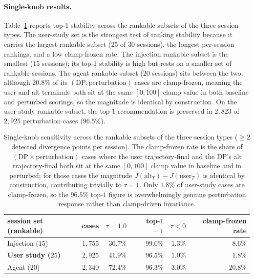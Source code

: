 \paragraph{Single-knob results.}
Table~\ref{tab:results-sensitivity-headline} reports top-$1$ stability across the rankable subsets of the three session types. The user-study set is the strongest test of ranking stability because it carries the largest rankable subset ($25$ of $30$ sessions), the longest per-session rankings, and a low clamp-frozen rate. The injection rankable subset is the smallest ($15$ sessions); its top-$1$ stability is high but rests on a smaller set of rankable sessions. The agent rankable subset ($20$ sessions) sits between the two, although $20.8\%$ of its $(\text{DP}, \text{perturbation})$ cases are clamp-frozen, meaning the user and alt terminals both sit at the same $[0, 100]$ clamp value in both baseline and perturbed scorings, so the magnitude is identical by construction. On the user-study rankable subset, the top-$1$ recommendation is preserved in $2{,}823$ of $2{,}925$ perturbation cases ($96.5\%$).

\begin{table}[htbp]
\centering
\small
\begin{tabular}{lrrrrr}
\hline
\textbf{session set (rankable)} & \textbf{cases} & \textbf{$\tau = 1.0$} & \textbf{top-$1$ $= 1$} & \textbf{$\tau < 0$} & \textbf{clamp-frozen rate} \\
\hline
Injection ($15$)         & $1{,}755$ & $30.7\%$ & $99.0\%$ & $1.3\%$ & $8.6\%$ \\
\textbf{User study ($25$)} & $2{,}925$ & $41.9\%$ & $\mathbf{96.5\%}$ & $1.0\%$ & $\mathbf{1.8\%}$ \\
Agent ($20$)              & $2{,}340$ & $72.4\%$ & $96.3\%$ & $3.0\%$ & $20.8\%$ \\
\hline
\end{tabular}
\caption{Single-knob sensitivity across the rankable subsets of the three session types ($\geq 2$ detected divergence points per session). The clamp-frozen rate is the share of $(\text{DP} \times \text{perturbation})$ cases where the user trajectory-final and the DP's alt trajectory-final both sit at the same $[0, 100]$ clamp value in baseline and in perturbed; for those cases the magnitude $J(\text{alt}_T) - J(\text{user}_T)$ is identical by construction, contributing trivially to $\tau = 1$. Only $1.8\%$ of user-study cases are clamp-frozen, so the $96.5\%$ top-$1$ figure is overwhelmingly genuine perturbation response rather than clamp-driven invariance.}
\label{tab:results-sensitivity-headline}
\end{table}

